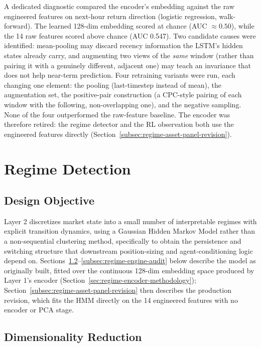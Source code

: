 A dedicated diagnostic compared the encoder's embedding against the raw engineered features on next-hour return direction (logistic regression, walk-forward). The learned 128-dim embedding scored at chance (AUC $\approx 0.50$), while the 14 raw features scored above chance (AUC 0.547). Two candidate causes were identified: mean-pooling may discard recency information the LSTM's hidden states already carry, and augmenting two views of the \emph{same} window (rather than pairing it with a genuinely different, adjacent one) may teach an invariance that does not help near-term prediction. Four retraining variants were run, each changing one element: the pooling (last-timestep instead of mean), the augmentation set, the positive-pair construction (a CPC-style \cite{infonce2018} pairing of each window with the following, non-overlapping one), and the negative sampling. None of the four outperformed the raw-feature baseline. The encoder was therefore retired: the regime detector and the RL observation both use the engineered features directly (Section~\ref{subsec:regime-asset-panel-revision}).

\section{Regime Detection}
\label{sec:regime-detection-methodology}

\subsection{Design Objective}
\label{subsec:regime-detection-objective}

Layer 2 discretizes market state into a small number of interpretable regimes with explicit transition dynamics, using a Gaussian Hidden Markov Model \cite{hamilton1989} rather than a non-sequential clustering method, specifically to obtain the persistence and switching structure that downstream position-sizing and agent-conditioning logic depend on. Sections~\ref{subsec:regime-pca}--\ref{subsec:regime-engine-audit} below describe the model as originally built, fitted over the continuous 128-dim embedding space produced by Layer 1's encoder (Section~\ref{sec:regime-encoder-methodology}); Section~\ref{subsec:regime-asset-panel-revision} then describes the production revision, which fits the HMM directly on the 14 engineered features with no encoder or PCA stage.

\subsection{Dimensionality Reduction}
\label{subsec:regime-pca}

